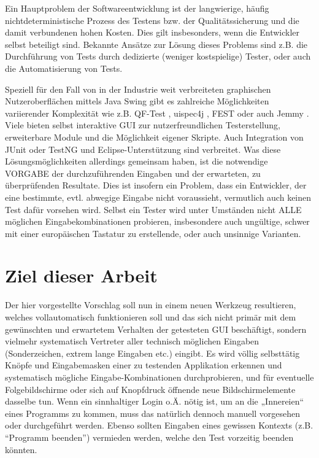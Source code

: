 Ein Hauptproblem der Softwareentwicklung ist der langwierige, häufig nichtdeterministische
Prozess des Testens bzw. der Qualitätssicherung und die damit verbundenen hohen Kosten.
Dies gilt insbesonders, wenn die Entwickler selbst beteiligt sind.
Bekannte Ansätze zur Lösung dieses Problems sind z.B. die Durchführung von Tests
durch dedizierte (weniger kostspielige) Tester, oder auch die Automatisierung von Tests. 
 
Speziell für den Fall von in der Industrie weit verbreiteten graphischen Nutzeroberflächen
mittels Java Swing \cite{JavaSwing} gibt es zahlreiche Möglichkeiten variierender
Komplexität wie z.B. QF-Test \cite{website:qftest}, uispec4j \cite{website:uispec4j},
FEST \cite{website:fest} oder auch Jemmy \cite{website:jemmy}. Viele bieten selbst interaktive
GUI zur nutzerfreundlichen Testerstellung, erweiterbare Module und die Möglichkeit eigener Skripte. Auch
Integration von JUnit \cite{website:junit} oder TestNG \cite{website:testng}
und Eclipse-Unterstützung \cite{website:eclipse} sind verbreitet. Was diese
Lösungsmöglichkeiten allerdings gemeinsam haben, ist die notwendige VORGABE der
durchzuführenden Eingaben und der erwarteten, zu überprüfenden Resultate. Dies ist
insofern ein Problem, dass ein Entwickler, der eine bestimmte, evtl. abwegige Eingabe nicht
voraussieht, vermutlich auch keinen Test dafür vorsehen wird. Selbst ein Tester wird unter
Umständen nicht ALLE möglichen Eingabekombinationen probieren, insbesondere auch
ungültige, schwer mit einer europäischen Tastatur zu erstellende, oder auch unsinnige Varianten. 
 


\section{Ziel dieser Arbeit}\label{structurelatex}


Der hier vorgestellte Vorschlag soll nun in einem neuen Werkzeug resultieren, welches vollautomatisch
funktionieren soll und das
sich nicht primär mit dem gewünschten und erwartetem Verhalten der getesteten GUI beschäftigt, sondern
vielmehr systematisch Vertreter aller technisch möglichen Eingaben (Sonderzeichen, extrem
lange Eingaben etc.) eingibt. Es wird völlig selbsttätig Knöpfe und Eingabemasken einer zu testenden
Applikation erkennen und systematisch mögliche Eingabe-Kombinationen durchprobieren, und für eventuelle
Folgebildschirme oder sich auf Knopfdruck öffnende neue Bildschirmelemente dasselbe tun.
Wenn ein sinnhaltiger Login o.Ä. nötig ist, um an die
„Innereien“ eines Programms zu kommen, muss das natürlich dennoch manuell vorgesehen oder
durchgeführt werden. Ebenso sollten Eingaben eines gewissen Kontexts (z.B. ``Programm beenden'')
vermieden werden, welche den Test vorzeitig beenden könnten.
 
